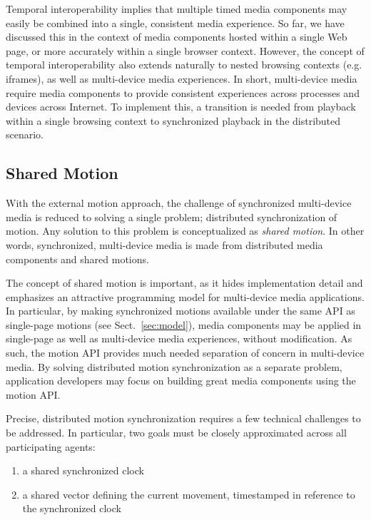 Temporal interoperability implies that multiple timed media components may
easily be combined into a single, consistent media experience. So far, we have
discussed this in the context of media components hosted within a single Web
page, or more accurately within a single browser context. However, the concept
of temporal interoperability also extends naturally to nested browsing
contexts (e.g. iframes), as well as multi-device media experiences. In short,
multi-device media require media components to provide consistent experiences
across processes and devices across Internet. To implement this, a transition
is needed from playback within a single browsing context to synchronized
playback in the distributed scenario.

\subsection {Shared Motion}

With the external motion approach, the challenge of synchronized multi-device
media is reduced to solving a single problem; distributed synchronization of
motion. Any solution to this problem is conceptualized as \emph{shared motion}. In
other words, synchronized, multi-device media is made from distributed media
components and shared motions.

The concept of shared motion is important, as it hides implementation detail
and emphasizes an attractive programming model for multi-device media
applications. In particular, by making synchronized motions available under
the same API as single-page motions (see Sect.~\ref{sec:model}), media components may be
applied in single-page as well as multi-device media experiences, without
modification. As such, the motion API provides much needed separation of
concern in multi-device media. By solving distributed motion synchronization
as a separate problem, application developers may focus on building great
media components using the motion API.



Precise, distributed motion synchronization requires a few technical
challenges to be addressed. In particular, two goals must be closely
approximated across all participating agents:

\begin{enumerate}
\item{a shared synchronized clock}
\item{a shared vector defining the current movement, timestamped in reference to the
synchronized clock}
\end{enumerate}

